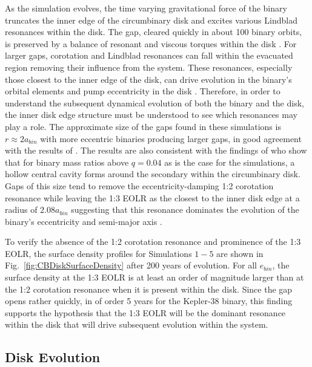 As the simulation evolves, the time varying gravitational force of the
binary truncates the inner edge of the circumbinary disk and excites
various Lindblad resonances within the disk.  The gap, cleared quickly
in about 100 binary orbits, is preserved by a balance of resonant and
viscous torques within the disk \citep{Artymowicz1994}.  For larger gaps,
corotation and Lindblad resonances can fall within the evacuated
region removing their influence from the system.  These resonances,
especially those closest to the inner edge of the disk, can drive
evolution in the binary's orbital elements \citep{Goldreich1980,Artymowicz1991} and
pump eccentricity in the disk \citep{Papaloizou2001}.  Therefore, in
order to understand the subsequent dynamical evolution of both the
binary and the disk, the inner disk edge structure must be understood to see which
resonances may play a role.  The approximate size of the gaps found in
these simulations is $r \approx 2 a_{bin}$ with more eccentric binaries
producing larger gaps, in good agreement with the results of
\citet{Artymowicz1994}.  The results are also consistent with the findings of \citet{DOrazio2016} who show that for binary mass ratios above $q = 0.04$ as is the case 
for the simulations, a hollow central cavity forms around the secondary within the circumbinary disk.  Gaps of this size tend to remove the eccentricity-damping 
1:2 corotation resonance while leaving the 1:3 EOLR as the closest to the inner disk edge at a radius of $2.08 a_{bin}$ suggesting that this resonance 
dominates the evolution of the binary's eccentricity and semi-major axis \citep{Artymowicz1991,Artymowicz1992,Papaloizou2001}.

To verify the absence of the 1:2 corotation resonance and prominence
of the 1:3 EOLR, the surface density profiles for Simulations $1-5$
are shown in Fig.~\ref{fig:CBDiskSurfaceDensity} after 200 years of evolution.
For all $e_{bin}$, the surface density at the 1:3 EOLR is at least an
order of magnitude larger than at the 1:2 corotation resonance when it
is present within the disk.  Since the gap opens rather quickly, in of order 5 years for the Kepler-38 binary,  this finding supports the hypothesis that the 1:3 EOLR will be the dominant resonance within the disk that will drive subsequent evolution within the system.


\subsection{Disk Evolution}

